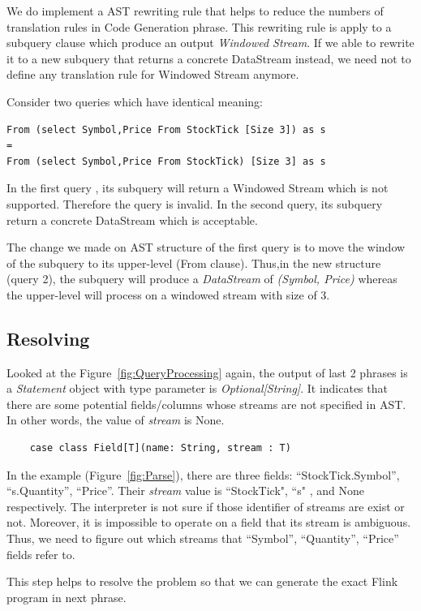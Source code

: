 We  do implement a AST rewriting rule that helps to reduce the numbers of translation rules in Code Generation phrase. This rewriting rule is apply to a subquery clause which produce an output \textit{Windowed Stream}. If we able to rewrite it to a new subquery that returns a concrete DataStream instead, we need not to define any translation rule for Windowed Stream anymore.

Consider two queries which have identical meaning:

\begin{lstlisting}
From (select Symbol,Price From StockTick [Size 3]) as s
=
From (select Symbol,Price From StockTick) [Size 3] as s
\end{lstlisting}

In the first query , its subquery will return a Windowed Stream which is not supported. Therefore the query is invalid. In the second query, its subquery return a concrete DataStream which is acceptable.

The change we made on AST structure of the first query is to move the window of the subquery to its upper-level (From clause). Thus,in the new structure (query 2), the subquery will produce a \textit{DataStream} of \textit{(Symbol, Price)} whereas the upper-level will process on a windowed stream with size of 3. 

\subsection{Resolving}
Looked at the Figure~\ref{fig:QueryProcessing} again,  the output of last 2 phrases is a \textit{Statement} object with type parameter is \textit{Optional[String]}.
It indicates that there are some potential fields/columns whose streams are not specified in AST. In other words, the value of \textit{stream} is None.
\begin{lstlisting}
	case class Field[T](name: String, stream : T)
\end{lstlisting}

In the example (Figure~\ref{fig:Parse}), there are three fields: ``StockTick.Symbol”, ``s.Quantity”, ``Price”. Their \textit{stream} value is ``StockTick", ``s" , and None respectively. The interpreter is not sure if those identifier of streams are exist or not. Moreover, it is impossible to operate on a field that its stream is ambiguous. Thus, we need to figure out  which streams that ``Symbol”, ``Quantity”, ``Price”  fields refer to.

This step helps to resolve the problem so that we can generate the exact Flink program in next phrase.

